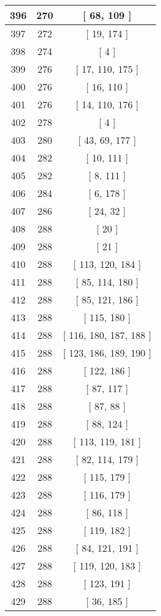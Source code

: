 \begin{center}
\begin{longtable}[H]{|| c c c ||}
\hline
396 & 270 & [ 68, 109 ] \\ 
\hline
397 & 272 & [ 19, 174 ] \\ 
\hline
398 & 274 & [ 4 ] \\ 
\hline
399 & 276 & [ 17, 110, 175 ] \\ 
\hline
400 & 276 & [ 16, 110 ] \\ 
\hline
401 & 276 & [ 14, 110, 176 ] \\ 
\hline
402 & 278 & [ 4 ] \\ 
\hline
403 & 280 & [ 43, 69, 177 ] \\ 
\hline
404 & 282 & [ 10, 111 ] \\ 
\hline
405 & 282 & [ 8, 111 ] \\ 
\hline
406 & 284 & [ 6, 178 ] \\ 
\hline
407 & 286 & [ 24, 32 ] \\ 
\hline
408 & 288 & [ 20 ] \\ 
\hline
409 & 288 & [ 21 ] \\ 
\hline
410 & 288 & [ 113, 120, 184 ] \\ 
\hline
411 & 288 & [ 85, 114, 180 ] \\ 
\hline
412 & 288 & [ 85, 121, 186 ] \\ 
\hline
413 & 288 & [ 115, 180 ] \\ 
\hline
414 & 288 & [ 116, 180, 187, 188 ] \\ 
\hline
415 & 288 & [ 123, 186, 189, 190 ] \\ 
\hline
416 & 288 & [ 122, 186 ] \\ 
\hline
417 & 288 & [ 87, 117 ] \\ 
\hline
418 & 288 & [ 87, 88 ] \\ 
\hline
419 & 288 & [ 88, 124 ] \\ 
\hline
420 & 288 & [ 113, 119, 181 ] \\ 
\hline
421 & 288 & [ 82, 114, 179 ] \\ 
\hline
422 & 288 & [ 115, 179 ] \\ 
\hline
423 & 288 & [ 116, 179 ] \\ 
\hline
424 & 288 & [ 86, 118 ] \\ 
\hline
425 & 288 & [ 119, 182 ] \\ 
\hline
426 & 288 & [ 84, 121, 191 ] \\ 
\hline
427 & 288 & [ 119, 120, 183 ] \\ 
\hline
428 & 288 & [ 123, 191 ] \\ 
\hline
429 & 288 & [ 36, 185 ] \\ 

\end{longtable}
\end{center}
